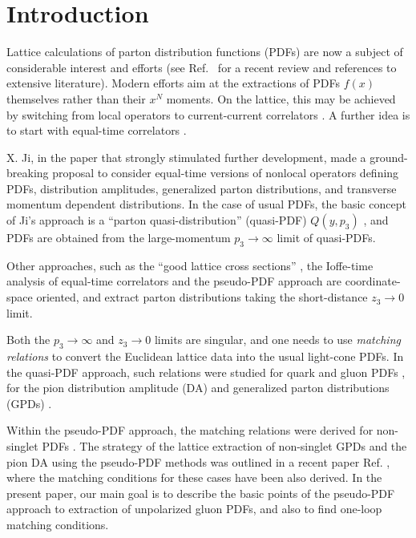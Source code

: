 \section{Introduction}

Lattice calculations of parton distribution functions (PDFs) are now a subject of considerable interest and efforts
(see Ref.~\cite{Cichy:2018mum} for a recent review and references to extensive literature).
Modern efforts aim at the extractions of PDFs $f(x)$ themselves rather than
their $x^N$ moments.
On the lattice, this
may be achieved by switching from
local operators to current-current correlators \cite{Detmold:2005gg}.
A further idea is to start
with equal-time correlators
\mbox{\cite{Braun:2007wv}}.

X. Ji, in the paper \cite{Ji:2013dva} that strongly stimulated further development,
made a ground-breaking proposal to consider equal-time versions of nonlocal operators
defining PDFs, distribution amplitudes, generalized parton distributions, and
transverse momentum dependent distributions.
In the case of usual PDFs, the
basic concept
of Ji's approach
is a ``parton quasi-distribution'' (quasi-PDF) $Q(y,p_3)$ \cite{Ji:2013dva,Ji:2014gla},
and
PDFs are obtained from the large-momentum $p_3 \to \infty$ limit
of quasi-PDFs.

Other approaches, such as
the ``good lattice cross sections''
\cite{Ma:2014jla,Ma:2017pxb}, the Ioffe-time analysis of equal-time correlators \cite{Braun:2007wv,Bali:2017gfr,Bali:2018spj}
and the pseudo-PDF approach \cite{Radyushkin:2017cyf,Radyushkin:2017sfi,Orginos:2017kos}
are coordinate-space oriented, and extract parton distributions taking the
short-distance $z_3 \to 0$ limit.

Both the $p_3\to \infty$ and $z_3\to 0$ limits are singular,
and one needs to use {\it matching relations}
to
convert the Euclidean lattice data into
the usual light-cone PDFs. In the quasi-PDF approach, such relations were studied
for quark \mbox{\cite{Ji:2013dva,Xiong:2013bka,Ji:2015jwa,Izubuchi:2018srq}} and gluon
PDFs \cite{Wang:2017eel,Wang:2017qyg,Wang:2019tgg}, for the
pion distribution amplitude (DA) \cite{Ji:2015qla} and generalized parton distributions (GPDs)
\cite{Ji:2015qla,Xiong:2015nua,Liu:2019urm}.

Within the pseudo-PDF approach,
the matching relations were derived for non-singlet
PDFs \cite{Ji:2017rah,Radyushkin:2017lvu,Radyushkin:2018cvn,Zhang:2018ggy,Izubuchi:2018srq}.
The strategy of the lattice extraction of non-singlet GPDs and the pion DA
using the pseudo-PDF methods was outlined
in a recent paper Ref. \cite{Radyushkin:2019owq},
where the matching conditions for these cases have been also derived.
In the present paper, our main goal is to describe the basic points
of the pseudo-PDF approach to extraction of unpolarized gluon PDFs, and also to find
one-loop matching conditions.


